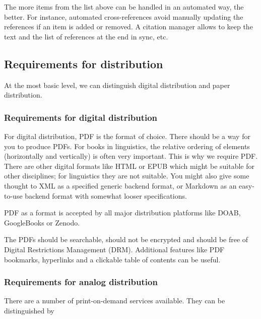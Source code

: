 \documentclass[nonflat,smallfont
]{langsci/langscibook}
\begin{document}
The more items from the list above can be handled in an automated way, the better. For instance, automated cross-references avoid manually updating the references if an item is added or removed. A citation manager allows to keep the text and the list of references at the end in sync, etc. 
                        
                        
                        
\subsection{Requirements for distribution}
At the most basic level, we can distinguish digital distribution and paper distribution. 

\subsubsection{Requirements for digital distribution}
For digital distribution, PDF is the format of choice. There should be a way for you to produce PDFs.  For books in linguistics, the relative ordering of elements (horizontally and vertically) is often very important. This is why we require PDF. There are other digital formats like HTML or EPUB which might be suitable for other disciplines; for linguistics they are not suitable. You might also give some thought to XML as a specified generic backend format, or Markdown as an easy-to-use backend format with somewhat looser specifications. 

PDF as a format is accepted by all major distribution platforms like DOAB, GoogleBooks or Zenodo. 
 

The PDFs should be searchable, should not be encrypted and should be free of Digital Restrictions Management (DRM). Additional features like PDF bookmarks, hyperlinks and a clickable table of contents can be useful. 

\subsubsection{Requirements for analog distribution}
There are a number of print-on-demand services available. They can be distinguished by 
\end{document}
